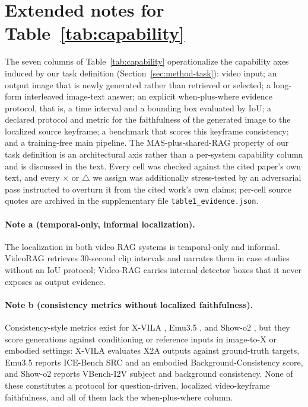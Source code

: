 \section{Extended notes for Table~\ref{tab:capability}}
\label{app:table1}

The seven columns of Table~\ref{tab:capability} operationalize the capability axes induced by our task definition (Section~\ref{sec:method-task}): video input; an output image that is newly generated rather than retrieved or selected; a long-form interleaved image-text answer; an explicit when-plus-where evidence protocol, that is, a time interval and a bounding box evaluated by IoU; a declared protocol and metric for the faithfulness of the generated image to the localized source keyframe; a benchmark that scores this keyframe consistency; and a training-free main pipeline. The MAS-plus-shared-RAG property of our task definition is an architectural axis rather than a per-system capability column and is discussed in the text. Every cell was checked against the cited paper's own text, and every $\times$ or $\triangle$ we assign was additionally stress-tested by an adversarial pass instructed to overturn it from the cited work's own claims; per-cell source quotes are archived in the supplementary file \texttt{table1\_evidence.json}.

\paragraph{Note a (temporal-only, informal localization).}
The localization in both video RAG systems is temporal-only and informal. VideoRAG \citep{videorag2502} retrieves 30-second clip intervals and narrates them in case studies without an IoU protocol; Video-RAG \citep{videorag2411} carries internal detector boxes that it never exposes as output evidence.

\paragraph{Note b (consistency metrics without localized faithfulness).}
Consistency-style metrics exist for X-VILA \citep{xvila2405}, Emu3.5 \citep{emu352510}, and Show-o2 \citep{showo22506}, but they score generations against conditioning or reference inputs in image-to-X or embodied settings: X-VILA evaluates X2A outputs against ground-truth targets, Emu3.5 reports ICE-Bench SRC and an embodied Background-Consistency score, and Show-o2 reports VBench-I2V subject and background consistency. None of these constitutes a protocol for question-driven, localized video-keyframe faithfulness, and all of them lack the when-plus-where column.

